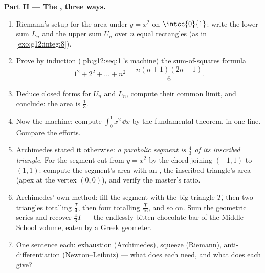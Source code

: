 \begin{problem}
\medskip
\noindent\textbf{Part II --- The , three ways.}
\begin{enumerate}[resume]
  \item Riemann's setup for the area under $y = x^2$ on
        $\intcc{0}{1}$: write the lower sum $L_n$ and the upper
        sum $U_n$ over $n$ equal rectangles (as in
        \cref{exo:g12:integ:8}).
  \item Prove by induction (\cref{pb:g12:seq:1}'s machine) the
        sum-of-squares formula
        \[
        1^2 + 2^2 + \dots + n^2 = \frac{n(n+1)(2n+1)}{6} .
        \]
  \item Deduce closed forms for $U_n$ and $L_n$, compute their
        common limit, and conclude: the area is $\frac13$.
  \item Now the machine: compute
        $\int_0^1 x^2\,\dd x$ by the fundamental theorem, in
        one line. Compare the efforts.
  \item Archimedes stated it otherwise: \emph{a parabolic
        segment is $\frac43$ of its inscribed triangle}. For
        the segment cut from $y = x^2$ by the chord joining
        $(-1, 1)$ to $(1, 1)$: compute the segment's area with
        an , the inscribed triangle's area (apex at the
        vertex $(0, 0)$), and verify the master's ratio.
  \item Archimedes' own method: fill the segment with the big
        triangle $T$, then two triangles totalling
        $\frac T4$, then four totalling $\frac{T}{16}$, and so
        on. Sum the geometric series and recover
        $\frac43 T$ --- the endlessly bitten chocolate bar of
        the Middle School volume, eaten by a Greek geometer.
  \item One sentence each: exhaustion (Archimedes), squeeze
        (Riemann), anti-differentiation (Newton--Leibniz) ---
        what does each need, and what does each give?
\end{enumerate}


\end{problem}
